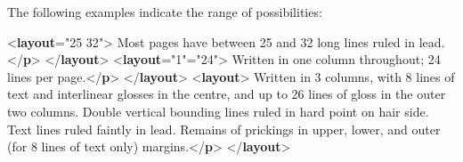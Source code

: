 The following examples indicate the range of possibilities: \par\bgroup{}\exampleFont \begin{shaded}\noindent\mbox{}{<\textbf{layout}\hspace*{1em}{ruledLines}="{25 32}">}\mbox{}\newline 
{}Most pages have between 25 and 32 long lines ruled in lead.{</\textbf{p}>}\mbox{}\newline 
{</\textbf{layout}>}\mbox{}\newline 
{<\textbf{layout}\hspace*{1em}{columns}="{1}"\hspace*{1em}{writtenLines}="{24}">}\mbox{}\newline 
{}Written in one column throughout; 24 lines per page.{</\textbf{p}>}\mbox{}\newline 
{</\textbf{layout}>}\mbox{}\newline 
{<\textbf{layout}>}\mbox{}\newline 
{}Written in 3 columns, with 8 lines of text and interlinear glosses in\mbox{}\newline 
\hspace*{1em}\hspace*{1em} the centre, and up to 26 lines of gloss in the outer two columns. Double\mbox{}\newline 
\hspace*{1em}\hspace*{1em} vertical bounding lines ruled in hard point on hair side. Text lines ruled\mbox{}\newline 
\hspace*{1em}\hspace*{1em} faintly in lead. Remains of prickings in upper, lower, and outer (for 8 lines of\mbox{}\newline 
\hspace*{1em}\hspace*{1em} text only) margins.{</\textbf{p}>}\mbox{}\newline 
{</\textbf{layout}>}\end{shaded}\egroup\par \par
